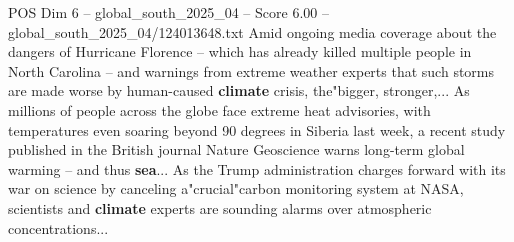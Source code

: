 \begin{textsample}{POS Dim 6 – global\_south\_2025\_04 – Score 6.00 – global\_south\_2025\_04/124013648.txt}
Amid ongoing media coverage about the dangers of Hurricane Florence -- which has already killed multiple people in North Carolina -- and warnings from extreme weather experts that such storms are made worse by human-caused \textbf{climate} crisis, the"bigger, stronger,...
As millions of people across the globe face extreme heat advisories, with temperatures even soaring beyond 90 degrees in Siberia last week, a recent study published in the British journal Nature Geoscience warns long-term global warming -- and thus \textbf{sea}...
As the Trump administration charges forward with its war on science by canceling a"crucial"carbon monitoring system at NASA, scientists and \textbf{climate} experts are sounding alarms over atmospheric concentrations...

\end{textsample}
